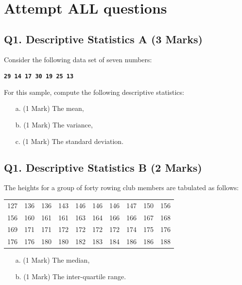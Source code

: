 \documentclass[a4paper,12pt]{article}
\begin{document}
\section*{Attempt ALL questions}
\subsection*{Q1. Descriptive Statistics A (3 Marks)} %
Consider the following data set of seven numbers:

\begin{center}
	\textbf{\texttt{29 14 17 30 19 25 13}}
\end{center}

\noindent For this sample, compute the following descriptive statistics:
\begin{itemize}
	\item[a.] (1 Mark) The mean,
	\item[b.] (1 Mark) The variance,
	\item[c.] (1 Mark) The standard deviation.
\end{itemize}

\subsection*{Q1. Descriptive Statistics B (2 Marks)} %
The heights for a group of forty rowing club members are tabulated as follows:

\begin{table}[ht]
	\begin{center}
		\begin{tabular}{|rrrrrrrrrr|}
			
			\hline
			127& 136& 136& 143& 146& 146& 146& 147& 150& 156\\
			156& 160& 161& 161& 163& 164& 166& 166& 167& 168\\
			169& 171& 171& 172& 172& 172& 172& 174& 175& 176\\
			176& 176& 180& 180& 182& 183& 184& 186& 186& 188\\
			\hline
		\end{tabular}
	\end{center}
\end{table}
\vspace{-0.5cm}
\begin{itemize}
	\item[a.] (1 Mark) The median,
	\item[b.] (1 Mark) The inter-quartile range.
\end{itemize}
\end{document}
